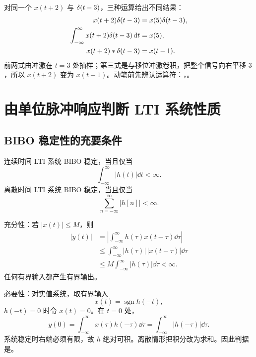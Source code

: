 \begin{example}[乘积、积分与卷积不可混淆]
  对同一个 $x(t+2)$ 与 $\delta(t-3)$，三种运算给出不同结果：
  \begin{align*}
    x(t+2)\delta(t-3)
      &=x(5)\delta(t-3),\\
    \int_{-\infty}^{\infty}x(t+2)\delta(t-3)\mathop{}\!\mathrm{d} t
      &=x(5),\\
    x(t+2)\mathbin{\ast}\delta(t-3)
      &=x(t-1).
  \end{align*}
  前两式由冲激在 $t=3$ 处抽样；第三式是与移位冲激卷积，把整个信号向右平移 $3$，所以 $x(t+2)$ 变为 $x(t-1)$。动笔前先辨认运算符：，。
\end{example}

\section{由单位脉冲响应判断 LTI 系统性质}
\label{sec:lti-properties-from-impulse-response}

\subsection{BIBO 稳定性的充要条件}

\begin{theorem}
  \label{thm:lti-bibo-impulse-response}
  连续时间 LTI 系统 BIBO 稳定，当且仅当
  \begin{equation}
    \int_{-\infty}^{\infty}|h(t)|\dd t<\infty.
    \label{eq:ct-lti-bibo-condition}
  \end{equation}
  离散时间 LTI 系统 BIBO 稳定，当且仅当
  \begin{equation}
    \sum_{n=-\infty}^{\infty}|h[n]|<\infty.
    \label{eq:dt-lti-bibo-condition}
  \end{equation}
\end{theorem}

充分性：若 $|x(t)|\leq M$，则
\begin{align*}
  |y(t)|
  &=\left|\int_{-\infty}^{\infty}h(\tau)x(t-\tau)\dd\tau\right|\\
  &\leq\int_{-\infty}^{\infty}|h(\tau)|\,|x(t-\tau)|\dd\tau\\
  &\leq M\int_{-\infty}^{\infty}|h(\tau)|\dd\tau<\infty.
\end{align*}
任何有界输入都产生有界输出。

必要性：对实值系统，取有界输入
\[
  x(t)=\operatorname{sgn}h(-t),
\]
$h(-t)=0$ 时令 $x(t)=0$。在 $t=0$ 处，
\[
  y(0)=\int_{-\infty}^{\infty}x(\tau)h(-\tau)\dd\tau
  =\int_{-\infty}^{\infty}|h(-\tau)|\dd\tau.
\]
系统稳定时右端必须有限，故 $h$ 绝对可积。离散情形把积分改为求和。因此判据是。

